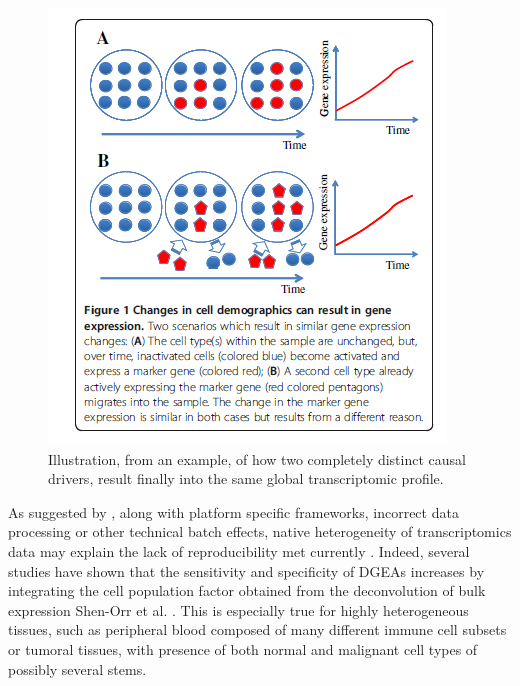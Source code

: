 \begin{figure}
\centering
\includegraphics[width=0.7\columnwidth]{figures/dgea_cytometry_consequence.PNG}
\caption{Illustration, from an \autocite{shoemaker_etal12} example, of how two completely distinct causal drivers, result finally into the same global transcriptomic profile.}
\label{fig:deconvolution-confusing-variable}
\end{figure}


 





As suggested by \autocite{baker16}, along
with platform specific frameworks, incorrect data processing or other
technical batch effects, native heterogeneity of transcriptomics data
may explain the lack of reproducibility met currently . Indeed, several
studies have shown that the sensitivity and specificity of DGEAs
increases by integrating the cell population factor obtained from the
deconvolution of bulk expression Shen-Orr et al.
\autocite{shen-orr_etal10}. This is especially true
for highly heterogeneous tissues, such as peripheral blood composed of
many different immune cell subsets or tumoral tissues, with presence of
both normal and malignant cell types of possibly several stems.

